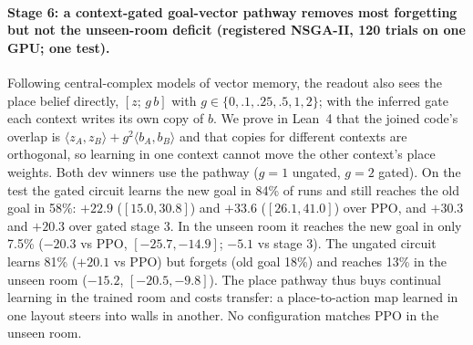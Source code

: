 \documentclass[10pt,onecolumn,letterpaper]{article}
\begin{document}
\paragraph{Stage 6: a context-gated goal-vector pathway removes most forgetting but not the unseen-room deficit (registered NSGA-II, 120 trials on one GPU; one test).}
Following central-complex models of vector memory, the readout also sees the place belief directly, $[z;\,g\,b]$ with
$g\in\{0,.1,.25,.5,1,2\}$; with the inferred gate each context writes its own copy of $b$. We prove in Lean~4 that the joined
code's overlap is $\langle z_A,z_B\rangle+g^2\langle b_A,b_B\rangle$ and that copies for different contexts are orthogonal, so
learning in one context cannot move the other context's place weights. Both dev winners use the pathway ($g=1$ ungated, $g=2$ gated).
On the test the gated circuit learns the new goal in 84\% of runs and still reaches the old goal in 58\%: $+22.9$ ($[15.0,30.8]$) and
$+33.6$ ($[26.1,41.0]$) over PPO, and $+30.3$ and $+20.3$ over gated stage 3. In the unseen room it reaches the new goal in only 7.5\%
($-20.3$ vs PPO, $[-25.7,-14.9]$; $-5.1$ vs stage 3). The ungated circuit learns 81\% ($+20.1$ vs PPO) but forgets (old goal 18\%) and
reaches 13\% in the unseen room ($-15.2$, $[-20.5,-9.8]$). The place pathway thus buys continual learning in the trained room and
costs transfer: a place-to-action map learned in one layout steers into walls in another. No configuration matches PPO in the unseen room.
\end{document}

